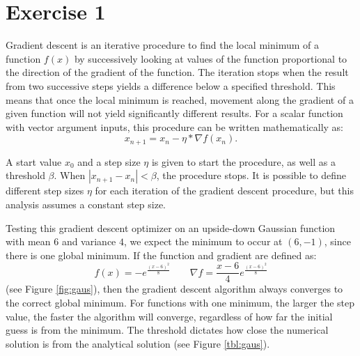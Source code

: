 \documentclass[10pt]{article}
\begin{document}
\section{Exercise 1}

Gradient descent is an iterative procedure to find the local minimum of a function $f(x)$ by successively looking at values of the function proportional to the direction of the gradient of the function. The iteration stops when the result from two successive steps yields a difference below a specified threshold. This means that once the local minimum is reached, movement along the gradient of a given function will not yield significantly different results. For a scalar function with vector argument inputs, this procedure can be written mathematically as: 
$$x_{n + 1} = x_n - \eta*\nabla f(x_n).$$

A start value $x_0$ and a step size $\eta$ is given to start the procedure, as well as a threshold $\beta$. When $|x_{n + 1} - x_n| < \beta$, the procedure stops. It is possible to define different step sizes $\eta$ for each iteration of the gradient descent procedure, but this analysis assumes a constant step size. 

Testing this gradient descent optimizer on an upside-down Gaussian function with mean $6$ and variance $4$, we expect the minimum to occur at $(6, -1)$, since there is one global minimum. If the function and gradient are defined as: 
$$f(x) = -e^{\frac{(x - 6)^2}{8}} \qquad \nabla f = \frac{x - 6}{4} e^{\frac{(x - 6)^2}{8}}$$
(see Figure \ref{fig:gaus}), then the gradient descent algorithm always converges to the correct global minimum. For functions with one minimum, the larger the step value, the faster the algorithm will converge, regardless of how far the initial guess is from the minimum. The threshold dictates how close the numerical solution is from the analytical solution (see Figure \ref{tbl:gaus}).
\end{document}
